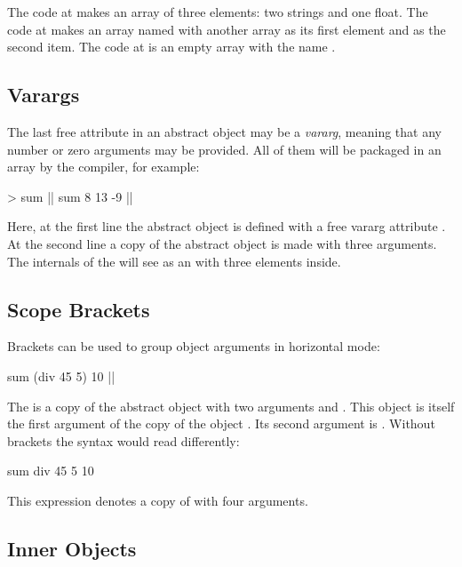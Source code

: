 The code at  makes an array of three elements: two strings
and one float. The code at  makes an array named  with another
array as its first element and  as the second item.
The code at  is an empty array with the name .

\subsection{Varargs}

The last free attribute in an abstract object may be a \emph{vararg},
meaning that any number or zero arguments may be provided. All of them
will be packaged in an array by the compiler, for example:

\begin{ffcode}
[x...] > sum |$\label{ln:sum-def}$|
sum 8 13 -9 |$\label{ln:sum-instance}$|
\end{ffcode}

Here, at the first line the abstract object  is defined
with a free vararg attribute . At the second line a copy of the
abstract object is made with three arguments. The internals of
the  will see  as an  with three
elements inside.

\subsection{Scope Brackets}

Brackets can be used to group object arguments in horizontal mode:

\begin{ffcode}
sum (div 45 5) 10  |$\label{ln:sum}$|
\end{ffcode}

The  is a copy of the abstract object 
with two arguments  and . This object is itself
the first argument of the copy of the object . Its second
argument is . Without brackets the syntax would read differently:

\begin{ffcode}
sum div 45 5 10
\end{ffcode}

This expression denotes a copy of  with four arguments.

\subsection{Inner Objects}


